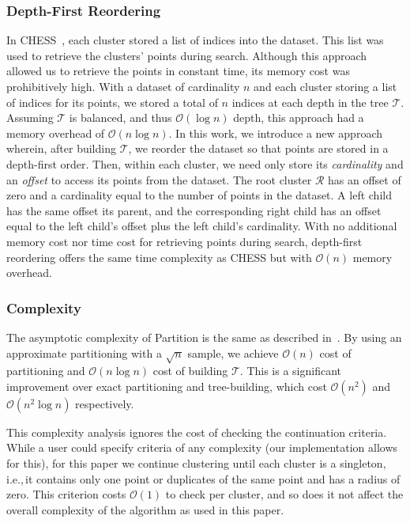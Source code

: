\subsubsection{Depth-First Reordering}
\label{sec:methods:clustering:depth-first-reordering}

In CHESS~\cite{ishaq2019clustered}, each cluster stored a list of indices into the dataset.
This list was used to retrieve the clusters' points during search.
Although this approach allowed us to retrieve the points in constant time, its memory cost was prohibitively high.
With a dataset of cardinality $n$ and each cluster storing a list of indices for its points, we stored a total of $n$ indices at each depth in the tree $\mathcal{T}$.
Assuming $\mathcal{T}$ is balanced, and thus $\mathcal{O}(\log n)$ depth, this approach had a memory overhead of $\mathcal{O}(n \log n)$.
In this work, we introduce a new approach wherein, after building $\mathcal{T}$, we reorder the dataset so that points are stored in a depth-first order.
Then, within each cluster, we need only store its \textit{cardinality} and an \textit{offset} to access its points from the dataset.
The root cluster $\mathcal{R}$ has an offset of zero and a cardinality equal to the number of points in the dataset.
A left child has the same offset its parent, and the corresponding right child has an offset equal to the left child's offset plus the left child's cardinality.
With no additional memory cost nor time cost for retrieving points during search, depth-first reordering offers the same time complexity as CHESS but with $\mathcal{O}(n)$ memory overhead.


\subsubsection{Complexity}
\label{sec:methods:clustering:complexity}

The asymptotic complexity of Partition is the same as described in~\cite{ishaq2019clustered}.
By using an approximate partitioning with a $\sqrt{n}$ sample, we achieve $\mathcal{O}(n)$ cost of partitioning and $\mathcal{O}(n \log n)$ cost of building $\mathcal{T}$.
This is a significant improvement over exact partitioning and tree-building, which cost $\mathcal{O}(n^2)$ and $\mathcal{O}(n^2 \log n)$ respectively.

This complexity analysis ignores the cost of checking the continuation criteria.
While a user could specify criteria of any complexity (our implementation allows for this), for this paper we continue clustering until each cluster is a singleton, i.e.,\,it contains only one point or duplicates of the same point and has a radius of zero.
This criterion costs $\mathcal{O}(1)$ to check per cluster, and so does it not affect the overall complexity of the algorithm as used in this paper.


